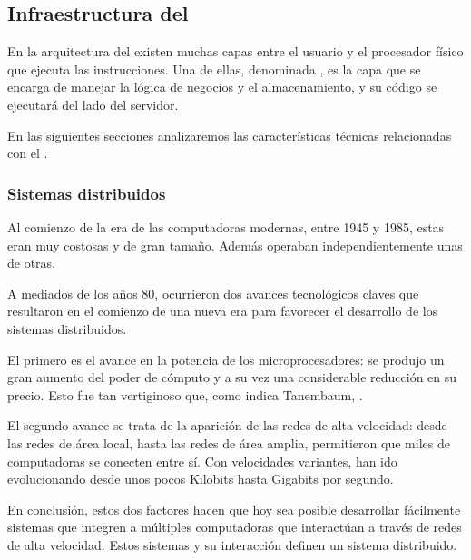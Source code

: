 
\subsection{Infraestructura del }
\label{marco_teorico}

En la arquitectura del  existen muchas capas entre el usuario y el procesador físico que ejecuta las instrucciones. Una de ellas, denominada , es la capa que se encarga de manejar la lógica de negocios y el almacenamiento, y su código se ejecutará del lado del servidor.

En las siguientes secciones analizaremos las características técnicas relacionadas con el .

\subsubsection{Sistemas distribuidos}
\label{sistemas_distribuidos}

Al comienzo de la era de las computadoras modernas, entre 1945 y 1985, estas eran muy costosas y de gran tamaño. Además operaban independientemente unas de otras.

A mediados de los años 80, ocurrieron dos avances tecnológicos claves que resultaron en el comienzo de una nueva era para favorecer el desarrollo de los sistemas distribuidos\cite{artnoema}. 

El primero es el avance en la potencia de los microprocesadores: se produjo un gran aumento del poder de cómputo y a su vez una considerable reducción en su precio. Esto fue tan vertiginoso que, como indica Tanembaum, \cite{tanenbaum2007distributed}.

El segundo avance se trata de la aparición de las redes de alta velocidad: desde las redes de área local, hasta las redes de área amplia, permitieron que miles de computadoras se conecten entre sí. Con velocidades variantes, han ido evolucionando desde unos pocos Kilobits hasta Gigabits por segundo.

En conclusión, estos dos factores hacen que hoy sea posible desarrollar fácilmente sistemas que integren a múltiples computadoras que interactúan a través de redes de alta velocidad.
Estos sistemas y su interacción definen un sistema distribuido.

